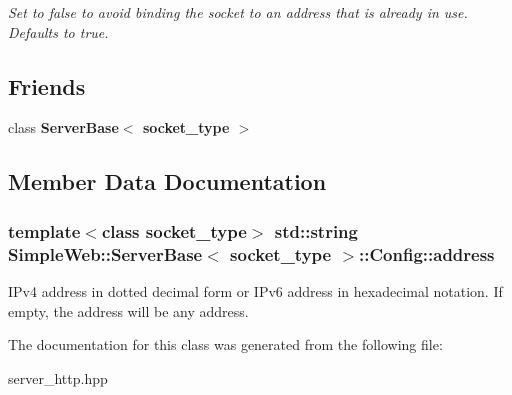 \begin{DoxyCompactItemize}
\begin{DoxyCompactList}\small\item\em Set to false to avoid binding the socket to an address that is already in use. Defaults to true. \end{DoxyCompactList}\end{DoxyCompactItemize}
\subsection*{Friends}
\begin{DoxyCompactItemize}
\item 
class {\bfseries Server\+Base$<$ socket\+\_\+type $>$}\hypertarget{a00062_a01d54a7e16ca437c98ec571deca98dfc}{}\label{a00062_a01d54a7e16ca437c98ec571deca98dfc}

\end{DoxyCompactItemize}


\subsection{Member Data Documentation}
\subsubsection[{\texorpdfstring{address}{address}}]{\setlength{\rightskip}{0pt plus 5cm}template$<$class socket\+\_\+type$>$ std\+::string {\bf Simple\+Web\+::\+Server\+Base}$<$ socket\+\_\+type $>$\+::Config\+::address}\hypertarget{a00062_add7a705aca3533bf0371708b19bb691c}{}\label{a00062_add7a705aca3533bf0371708b19bb691c}
I\+Pv4 address in dotted decimal form or I\+Pv6 address in hexadecimal notation. If empty, the address will be any address. 

The documentation for this class was generated from the following file\+:\begin{DoxyCompactItemize}
\item 
server\+\_\+http.\+hpp\end{DoxyCompactItemize}
